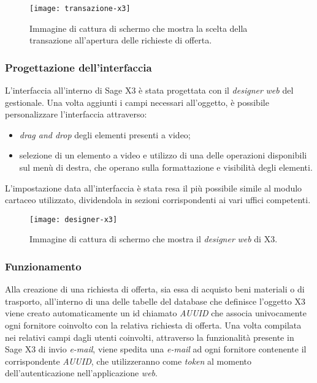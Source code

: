 \begin{figure}[htbp]
	\begin{center}
		\texttt{[image: transazione-x3]}
		\caption{Immagine di cattura di schermo che mostra la scelta della transazione all'apertura delle richieste di offerta.}
	\end{center}
\end{figure}

\subsubsection{Progettazione dell'interfaccia}
L'interfaccia all'interno di Sage X3 è stata progettata con il \textit{designer} \textit{web} del gestionale.
Una volta aggiunti i campi necessari all'oggetto, è possibile personalizzare l'interfaccia attraverso:
\begin{itemize}
	\item \textit{drag and drop} degli elementi presenti a video;
	\item  selezione di un elemento a video e utilizzo di una delle operazioni disponibili sul menù di destra, che operano sulla formattazione e visibilità degli elementi.
\end{itemize}
L'impostazione data all'interfaccia è stata resa il più possibile simile al modulo cartaceo utilizzato, dividendola in sezioni corrispondenti ai vari uffici competenti.

\begin{figure}[htbp]
	\begin{center}
		\texttt{[image: designer-x3]}
		\caption{Immagine di cattura di schermo che mostra il \textit{designer} \textit{web} di X3.}
	\end{center}
\end{figure}

\subsubsection{Funzionamento}
Alla creazione di una richiesta di offerta, sia essa di acquisto beni materiali o di trasporto, all'interno di una delle tabelle del database che definisce l'oggetto X3 viene creato automaticamente un id chiamato \textit{AUUID} che associa univocamente ogni fornitore coinvolto con la relativa richiesta di offerta.
Una volta compilata nei relativi campi dagli utenti coinvolti, attraverso la funzionalità presente in Sage X3 di invio \textit{e-mail}, viene spedita una \textit{e-mail} ad ogni fornitore contenente il corrispondente \textit{AUUID}, che utilizzeranno come \textit{token} al momento dell'autenticazione nell'applicazione \textit{web}.

